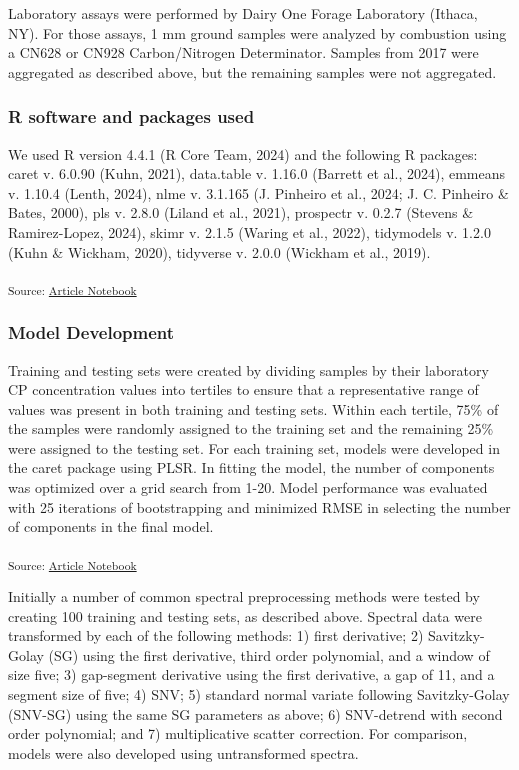 \documentclass[
]{agujournal2019}
\begin{document}
Laboratory assays were performed by Dairy One Forage Laboratory (Ithaca,
NY). For those assays, 1 mm ground samples were analyzed by combustion
using a CN628 or CN928 Carbon/Nitrogen Determinator. Samples from 2017
were aggregated as described above, but the remaining samples were not
aggregated.

\subsubsection{R software and packages
used}\label{r-software-and-packages-used}

We used R version 4.4.1 (R Core Team, 2024) and the following R
packages: caret v. 6.0.90 (Kuhn, 2021), data.table v. 1.16.0 (Barrett et
al., 2024), emmeans v. 1.10.4 (Lenth, 2024), nlme v. 3.1.165 (J.
Pinheiro et al., 2024; J. C. Pinheiro \& Bates, 2000), pls v. 2.8.0
(Liland et al., 2021), prospectr v. 0.2.7 (Stevens \& Ramirez-Lopez,
2024), skimr v. 2.1.5 (Waring et al., 2022), tidymodels v. 1.2.0 (Kuhn
\& Wickham, 2020), tidyverse v. 2.0.0 (Wickham et al., 2019).

\textsubscript{Source:
\href{https://rvcrawford.github.io/glowing-system/index.qmd.html}{Article
Notebook}}

\subsubsection{Model Development}\label{model-development}

Training and testing sets were created by dividing samples by their
laboratory CP concentration values into tertiles to ensure that a
representative range of values was present in both training and testing
sets. Within each tertile, 75\% of the samples were randomly assigned to
the training set and the remaining 25\% were assigned to the testing
set. For each training set, models were developed in the caret package
using PLSR. In fitting the model, the number of components was optimized
over a grid search from 1-20. Model performance was evaluated with 25
iterations of bootstrapping and minimized RMSE in selecting the number
of components in the final model.

\textsubscript{Source:
\href{https://rvcrawford.github.io/glowing-system/index.qmd.html}{Article
Notebook}}

Initially a number of common spectral preprocessing methods were tested
by creating 100 training and testing sets, as described above. Spectral
data were transformed by each of the following methods: 1) first
derivative; 2) Savitzky-Golay (SG) using the first derivative, third
order polynomial, and a window of size five; 3) gap-segment derivative
using the first derivative, a gap of 11, and a segment size of five; 4)
SNV; 5) standard normal variate following Savitzky-Golay (SNV-SG) using
the same SG parameters as above; 6) SNV-detrend with second order
polynomial; and 7) multiplicative scatter correction. For comparison,
models were also developed using untransformed spectra.
\end{document}
